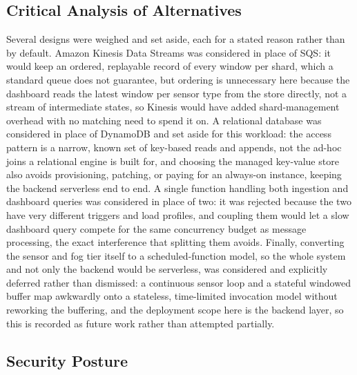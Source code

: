 \documentclass[conference]{IEEEtran}
\begin{document}
\subsection{Critical Analysis of Alternatives}

Several designs were weighed and set aside, each for a stated reason rather than by default. Amazon Kinesis Data Streams was considered in place of SQS: it would keep an ordered, replayable record of every window per shard, which a standard queue does not guarantee, but ordering is unnecessary here because the dashboard reads the latest window per sensor type from the store directly, not a stream of intermediate states, so Kinesis would have added shard-management overhead with no matching need to spend it on. A relational database was considered in place of DynamoDB and set aside for this workload: the access pattern is a narrow, known set of key-based reads and appends, not the ad-hoc joins a relational engine is built for, and choosing the managed key-value store also avoids provisioning, patching, or paying for an always-on instance, keeping the backend serverless end to end. A single function handling both ingestion and dashboard queries was considered in place of two: it was rejected because the two have very different triggers and load profiles, and coupling them would let a slow dashboard query compete for the same concurrency budget as message processing, the exact interference that splitting them avoids. Finally, converting the sensor and fog tier itself to a scheduled-function model, so the whole system and not only the backend would be serverless, was considered and explicitly deferred rather than dismissed: a continuous sensor loop and a stateful windowed buffer map awkwardly onto a stateless, time-limited invocation model without reworking the buffering, and the deployment scope here is the backend layer, so this is recorded as future work rather than attempted partially.

\subsection{Security Posture}
\end{document}
